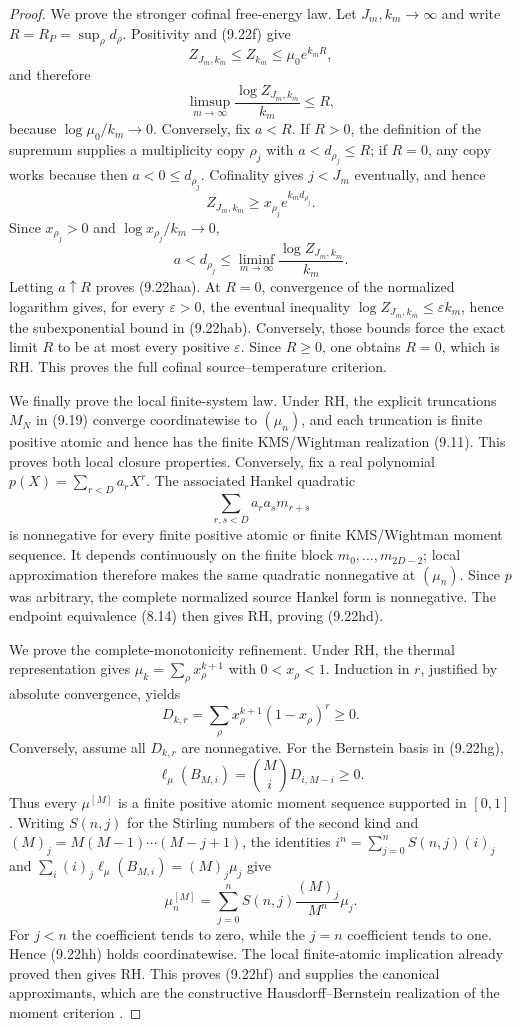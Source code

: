 \documentclass[11pt]{article}
\begin{document}
\begin{proof}
We prove the stronger cofinal free-energy law.  Let $J_m,k_m\to\infty$ and write
$R=R_P=\sup_\rho d_\rho$.  Positivity and \textup{(9.22f)} give
\[
 Z_{J_m,k_m}\le Z_{k_m}\le\mu_0e^{k_mR},
\]
and therefore
\[
 \limsup_{m\to\infty}\frac{\log Z_{J_m,k_m}}{k_m}\le R,
\]
because $\log\mu_0/k_m\to0$.  Conversely, fix $a<R$.  If $R>0$, the definition of the
supremum supplies a multiplicity copy $\rho_j$ with $a<d_{\rho_j}\le R$; if $R=0$, any copy
works because then $a<0\le d_{\rho_j}$.  Cofinality gives $j<J_m$ eventually, and hence
\[
 Z_{J_m,k_m}\ge x_{\rho_j}e^{k_md_{\rho_j}}.
\]
Since $x_{\rho_j}>0$ and $\log x_{\rho_j}/k_m\to0$,
\[
 a<d_{\rho_j}\le
 \liminf_{m\to\infty}\frac{\log Z_{J_m,k_m}}{k_m}.
\]
Letting $a\uparrow R$ proves \textup{(9.22haa)}.  At $R=0$, convergence of the normalized
logarithm gives, for every $\varepsilon>0$, the eventual inequality
$\log Z_{J_m,k_m}\le\varepsilon k_m$, hence the subexponential bound in
\textup{(9.22hab)}.  Conversely, those bounds force the exact limit $R$ to be at most every
positive $\varepsilon$.  Since $R\ge0$, one obtains $R=0$, which is RH.  This proves the full
cofinal source--temperature criterion.

We finally prove the local finite-system law.  Under RH, the explicit truncations \(M_N\) in
\textup{(9.19)} converge coordinatewise to \((\mu_n)\), and each truncation is finite positive
atomic and hence has the finite KMS/Wightman realization \textup{(9.11)}.  This proves both local
closure properties.  Conversely, fix a real polynomial \(p(X)=\sum_{r<D}a_rX^r\).  The associated
Hankel quadratic
\[
 \sum_{r,s<D}a_ra_s m_{r+s}
\]
is nonnegative for every finite positive atomic or finite KMS/Wightman moment sequence.  It
depends continuously on the finite block \(m_0,\ldots,m_{2D-2}\); local approximation therefore
makes the same quadratic nonnegative at \((\mu_n)\).  Since \(p\) was arbitrary, the complete
normalized source Hankel form is nonnegative.  The endpoint equivalence
\textup{(8.14)} then gives RH, proving \textup{(9.22hd)}.

We prove the complete-monotonicity refinement.  Under RH, the thermal representation gives
\(
 \mu_k=\sum_\rho x_\rho^{k+1}
\)
with $0<x_\rho<1$.  Induction in $r$, justified by absolute convergence, yields
\[
 D_{k,r}=\sum_\rho x_\rho^{k+1}(1-x_\rho)^r\ge0.
 \tag{9.26d}
\]
Conversely, assume all $D_{k,r}$ are nonnegative.  For the Bernstein basis in
\textup{(9.22hg)},
\[
 \ell_\mu(B_{M,i})=\binom MiD_{i,M-i}\ge0.
 \tag{9.26e}
\]
Thus every $\mu^{[M]}$ is a finite positive atomic moment sequence supported in $[0,1]$.
Writing $S(n,j)$ for the Stirling numbers of the second kind and
$(M)_j=M(M-1)\cdots(M-j+1)$, the identities
$i^n=\sum_{j=0}^nS(n,j)(i)_j$ and
$\sum_i(i)_j\ell_\mu(B_{M,i})=(M)_j\mu_j$ give
\[
 \mu_n^{[M]}
 =\sum_{j=0}^nS(n,j)\frac{(M)_j}{M^n}\mu_j.
 \tag{9.26f}
\]
For $j<n$ the coefficient tends to zero, while the $j=n$ coefficient tends to one.
Hence \textup{(9.22hh)} holds coordinatewise.  The local finite-atomic implication already
proved then gives RH.  This proves \textup{(9.22hf)} and supplies the canonical approximants,
which are the constructive Hausdorff--Bernstein realization of the moment criterion
\cite{Hausdorff1921}.


\end{proof}
\end{document}
